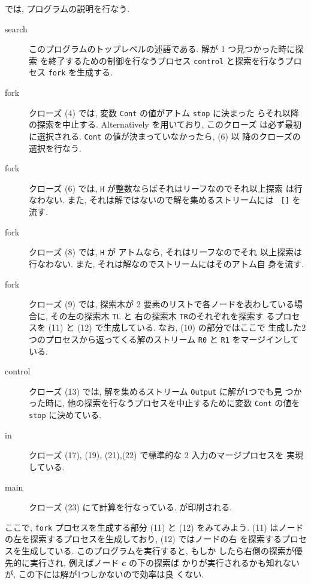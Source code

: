 \documentclass[a4,titlepage]{jsreport}
\def\em{\bf\dg}
\let\dg\bf
\begin{document}
では, プログラムの説明を行なう.

\begin{description}
\item[search]
このプログラムのトップレベルの述語である.  解が 1 つ見つかった時に探索
を終了するための制御を行なうプロセス {\tt control} と探索を行なうプロ
セス {\tt fork} を生成する.
\item[fork]
クローズ (4) では, 変数 {\tt Cont} の値がアトム {\tt stop} に決まった
らそれ以降の探索を中止する.  Alternatively を用いており, このクローズ
は必ず最初に選択される.  {\tt Cont} の値が決まっていなかったら, (6) 以
降のクローズの選択を行なう.
\item[fork]
クローズ (6) では, {\tt H} が整数ならばそれはリーフなのでそれ以上探索
は行なわない.  また, それは解ではないので解を集めるストリームには {\tt
[]} を流す.
\item[fork]
クローズ (8) では, {\tt H} が アトムなら, それはリーフなのでそれ
以上探索は行なわない.  また, それは解なのでストリームにはそのアトム自
身を流す.
\item[fork]
クローズ (9) では, 探索木が 2 要素のリストで各ノードを表わしている場
合に, その左の探索木 {\tt TL} と 右の探索木 {\tt TR}のそれぞれを探索す
るプロセスを (11) と (12) で生成している.  なお, (10) の部分ではここで
生成した2つのプロセスから返ってくる解のストリーム {\tt R0} と {\tt R1} 
をマージインしている.
\item[control]
クローズ (13) では, 解を集めるストリーム {\tt Output} に解が1つでも見
つかった時に, 他の探索を行なうプロセスを中止するために変数 {\tt Cont}
の値を {\tt stop} に決めている.
\item [in]
クローズ (17), (19), (21),(22) で標準的な 2 入力のマージプロセスを
実現している.
\item [main]
クローズ (23) にて計算を行なっている. {\sf [here]} が印刷される.
\end{description}

ここで, {\tt fork} プロセスを生成する部分 (11) と (12) をみてみよう.
(11) はノードの左を探索するプロセスを生成しており, (12) ではノードの右
を探索するプロセスを生成している.  このプログラムを実行すると, もしか
したら右側の探索が優先的に実行され, 例えばノード {\em c} の下の探索ば
かりが実行されるかも知れないが, この下には解が1つしかないので効率は良
くない.

\end{document}
